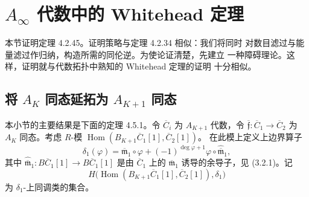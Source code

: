 
\section{$A_\infty$ 代数中的 Whitehead 定理}
\label{sec:4-5}

本节证明定理 4.2.45。证明策略与定理 4.2.34 相似：我们将同时
对数目滤过与能量滤过作归纳，构造所需的同伦逆。为使论证清楚，先建立
一种障碍理论。这样，证明就与代数拓扑中熟知的 Whitehead 定理的证明
十分相似。

\subsection{将 $A_K$ 同态延拓为 $A_{K+1}$ 同态}
\label{subsec:4-5-1}

本小节的主要结果是下面的定理 4.5.1。令 $\overline C_i$ 为
$A_{K+1}$ 代数，令
$\overline{\mathfrak f}\colon\overline C_1\to\overline C_2$
为 $A_K$ 同态。考虑 $R$-模
$\operatorname{Hom}(B_{K+1}\overline C_1[1],\overline C_2[1])$。
在此模上定义上边界算子
\[
 \delta_1(\varphi)
 =\overline{\mathfrak m}_1\circ\varphi
 +(-1)^{\deg\varphi+1}
 \varphi\circ\widehat{\overline{\mathfrak m}}_1,
\]
其中
$\widehat{\overline{\mathfrak m}}_1\colon
B\overline C_1[1]\to B\overline C_1[1]$
是由 $\overline C_1$ 上的 $\overline{\mathfrak m}_1$
诱导的余导子，见 (3.2.1)。记
\[
 H\bigl(\operatorname{Hom}
 (B_{K+1}\overline C_1[1],\overline C_2[1]),\delta_1\bigr)
\]
为 $\delta_1$-上同调类的集合。

